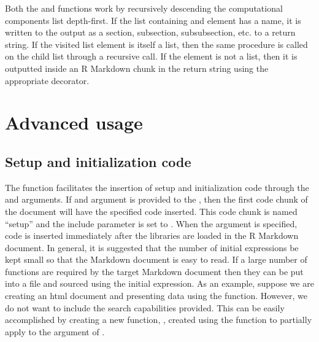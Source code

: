 \documentclass[
]{jss}
\begin{document}
Both the  and  functions
work by recursively descending the computational components list
depth-first. If the list containing and element has a name, it is
written to the output as a section, subsection, subsubsection, etc. to a
return string. If the visited list element is itself a list, then the
same procedure is called on the child list through a recursive call. If
the element is not a list, then it is outputted inside an R Markdown
chunk in the return string using the appropriate decorator.

\hypertarget{advanced-usage}{%
\section{Advanced usage}\label{advanced-usage}}

\hypertarget{setup-and-initialization-code}{%
\subsection{Setup and initialization
code}\label{setup-and-initialization-code}}

The  function facilitates the insertion of setup and
initialization code through the  and 
arguments. If and argument is provided to the , then
the first code chunk of the document will have the specified code
inserted. This code chunk is named ``setup'' and the include parameter
is set to . When the  argument is specified,
code is inserted immediately after the libraries are loaded in the R
Markdown document. In general, it is suggested that the number of
initial expressions be kept small so that the  Markdown
document is easy to read. If a large number of functions are required by
the target  Markdown document then they can be put into a
file and sourced using the initial expression. As an example, suppose we
are creating an html document and presenting data using the
 function. However, we do not want to include the
search capabilities provided. This can be easily accomplished by
creating a new function, , created using the
 function \cite{purrr} to partially apply
 to the  argument of
.
\end{document}
